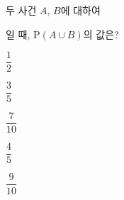 두 사건 $A$, $B$에 대하여 \par\smallskip{}\par\smallskip\noindent 일 때, $\mathrm{P}(A\cup B)$의 값은?
\begin{choices32}{\rule[-3ex]{0pt}{8ex}$\dfrac{1}{2}$}{\rule[-3ex]{0pt}{8ex}$\dfrac{3}{5}$}{\rule[-3ex]{0pt}{8ex}$\dfrac{7}{10}$}{\rule[-3ex]{0pt}{8ex}$\dfrac{4}{5}$}{\rule[-3ex]{0pt}{8ex}$\dfrac{9}{10}$}\end{choices32}
